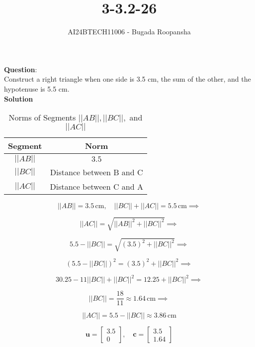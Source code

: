 \documentclass[journal]{IEEEtran}
\begin{document}

\vspace{3cm}

\title{3-3.2-26}
\author{AI24BTECH11006 - Bugada Roopansha}
{\let\newpage\relax\maketitle}  %

\renewcommand{\thefigure}{\theenumi}
\renewcommand{\thetable}{\theenumi}
\setlength{\intextsep}{10pt} %
\textbf{Question}:\\
Construct a right triangle when one side is 3.5 cm, the sum of the other, and the hypotenuse is 5.5 cm.\\
\textbf{Solution}\\
\begin{table}[h!]
\centering
\begin{tabular}{|c|c|}
\hline
\textbf{Segment} & \textbf{Norm} \\ \hline
\( ||AB|| \) & $3.5$ \\ \hline
\( ||BC|| \) & Distance between B and C \\ \hline
\( ||AC|| \) & Distance between C and A \\ \hline
\end{tabular}
\caption{Norms of Segments \( ||AB||, ||BC||, \) and \( ||AC|| \)}
\end{table}

\[ 
||AB|| = 3.5 \, \text{cm}, \quad ||BC|| + ||AC|| = 5.5 \, \text{cm} \implies 
\]

\[ 
||AC|| = \sqrt{||AB||^2 + ||BC||^2} \implies 
\]

\[ 
5.5 - ||BC|| = \sqrt{(3.5)^2 + ||BC||^2} \implies 
\]

\[ 
(5.5 - ||BC||)^2 = (3.5)^2 + ||BC||^2 \implies 
\]

\[ 
30.25 - 11||BC|| + ||BC||^2 = 12.25 + ||BC||^2 \implies 
\]

\[ 
||BC|| = \frac{18}{11} \approx 1.64 \, \text{cm} \implies 
\]

\[ 
||AC|| = 5.5 - ||BC|| \approx 3.86 \, \text{cm} 
\]

\[ 
\mathbf{u} = \begin{bmatrix} 3.5 \\ 0 \end{bmatrix}, \quad \mathbf{c} = \begin{bmatrix} 3.5 \\ 1.64 \end{bmatrix} 
\]
\end{document}
